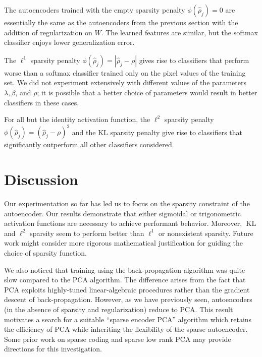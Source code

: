 \documentclass[twocolumn]{article}
\DeclareMathOperator{\KL}{KL}
\begin{document}
The autoencoders trained with the empty sparsity penalty $\phi(\hat\rho_j)=0$
are essentially the same as the autoencoders from the previous section with the
addition of regularization on $W$. The learned features are similar, but the
softmax classifier enjoys lower generalization error.

The $\ell^1$ sparsity penalty $\phi(\hat\rho_j)=|\hat\rho_j-\rho|$ gives rise
to classifiers that perform worse than a softmax classifier trained only on the
pixel values of the training set. We did not experiment extensively with different
values of the parameters $\lambda,\beta$, and $\rho$; it is possible that a better
choice of parameters would result in better classifiers in these cases.

For all but the identity activation function, 
the $\ell^2$ sparsity penalty $\phi(\hat\rho_j)=(\hat\rho_j-\rho)^2$ and the KL
sparsity penalty give rise to classifiers that significantly outperform all other
classifiers considered.

\section{Discussion}
Our experimentation so far has led us to focus on the sparsity constraint of the
autoencoder. Our results demonstrate that either sigmoidal or trigonometric
activation functions are necessary to achieve performant behavior. Moreover,
$\KL$ and $\ell^2$ sparsity seem to perform better than $\ell^1$ or nonexistent
sparsity. Future work might consider more rigorous mathematical justification
for guiding the choice of sparsity function.

We also noticed that training using the back-propagation algorithm
\cite{rumelhart2002learning} was quite slow compared to the PCA algorithm. The
difference arises from the fact that PCA exploits highly-tuned linear-algebraic
procedures rather than the gradient descent of back-propagation. However, as we
have previously seen, autoencoders (in the absence of sparsity and
regularization) reduce to PCA. This result motivates a search for a suitable
``sparse encoder PCA'' algorithm which retains the efficiency of PCA while
inheriting the flexibility of the sparse autoencoder. Some prior work on sparse
coding \cite{lee2007efficient} and sparse low rank PCA \cite{shen2008sparse} may
provide directions for this investigation.

\end{document}
